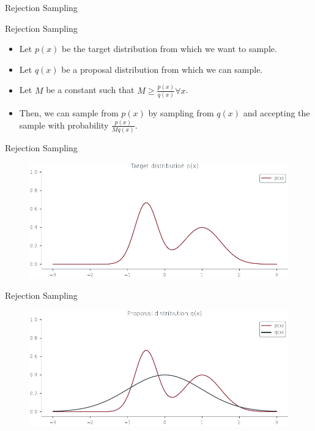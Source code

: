 \documentclass{beamer}
\begin{document}
\begin{section}{Rejection Sampling}
    \begin{frame}{Rejection Sampling}
        \begin{itemize}
            \item Let $p(x)$ be the target distribution from which we want to sample.
            \item Let $q(x)$ be a proposal distribution from which we can sample.
            \item Let $M$ be a constant such that $M \geq \frac{p(x)}{q(x)} \forall x$.
            \item Then, we can sample from $p(x)$ by sampling from $q(x)$ and accepting the sample with probability $\frac{p(x)}{M q(x)}$.
        \end{itemize}
        
    \end{frame}

   \begin{frame}{Rejection Sampling}
    \begin{figure}
        \centering
        \includegraphics[scale = 0.75]{../figures/sampling/rejection-sampling--1.0-False-False-False-False-False-False-False-False.pdf}
    \end{figure}
    
   \end{frame}

    \begin{frame}{Rejection Sampling}
        \begin{figure}
            \centering
            \includegraphics[scale = 0.75]{../figures/sampling/rejection-sampling--1.0-True-False-False-False-False-False-False-False.pdf}
        \end{figure}
    \end{frame}


\end{section}
\end{document}
